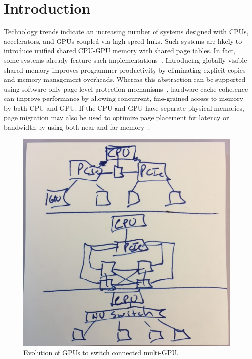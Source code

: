 \section{Introduction}
\label{introduction}

Technology trends indicate an increasing number of systems designed with CPUs, 
accelerators, and GPUs coupled via high-speed 
links. Such systems are likely to introduce unified shared
CPU-GPU memory with shared page tables. In fact, some systems already
feature such implementations~\cite{AMDKaveri}.
Introducing globally visible shared memory
improves programmer productivity by eliminating explicit copies and memory 
management overheads. Whereas this abstraction can be supported using
software-only page-level protection mechanisms~\cite{UVM, HSA}, hardware cache coherence 
can improve performance by allowing concurrent, fine-grained access to memory
by both CPU and GPU.  If the CPU and GPU have separate physical
memories, page migration may also be used to optimize page placement for
latency or bandwidth by using both near and far 
memory~\cite{Dashti2013,Agarwal2015b,Meswani2015,Chou2015}.

\begin{figure}[t]
\centering
\includegraphics[width=0.9\columnwidth]{figures/fig1.jpg}
\caption{Evolution of GPUs to switch connected multi-GPU.}

\label{fig:motivation}
\end{figure}

